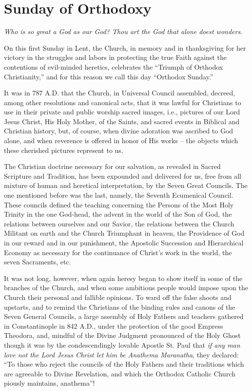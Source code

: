 \chapter{Sunday of Orthodoxy}

\textit{Who is so great a God as our God? Thou art the God that alone doest wonders}.

On this first Sunday in Lent, the Church, 
in memory and in thanksgiving for her victory
in the struggles and labors in protecting 
the true Faith against the contentions of evil-minded
heretics, celebrates the ``Triumph of 
Orthodox Christianity,'' and for this reason we 
call this day ``Orthodox Sunday.'' 

It was in 787 A.D. that the Church, in Universal
Council assembled, decreed, among other 
resolutions and canonical acts, that it was lawful 
for Christians to use in their private and public 
worship sacred images, i.e., pictures of our 
Lord Jesus Christ, His Holy Mother, of the 
Saints, and sacred events in Biblical and Christian
history, but, of course, when divine adoration
was ascribed to God alone, and when reverence
is offered in honor of His works -- the 
objects which these cherished pictures represent 
to us. 

The Christian doctrine necessary for our salvation,
as revealed in Sacred Scripture and 
Tradition, has been expounded and delivered 
for us, free from all mixture of human and heretical 
interpretation, by the Seven Great Councils. 
The one mentioned before was the last, namely, 
the Seventh Ecumenical Council. These councils
defined the teaching concerning the Persons 
of the Most Holy Trinity in the one God-head, 
the advent in the world of the Son of God, the 
relations between ourselves and our Savior, 
the relations between the Church Militant on 
earth and the Church Triumphant in heaven, 
the Providence of God in our reward and in 
our punishment, the Apostolic Succession and 
Hierarchical Economy as necessary for the continuance
of Christ's work in the world, the seven 
Sacraments, etc. 

It was not long, however, when again heresy 
began to show itself in some of the branches of 
the Church, and when some ambitious people 
would impose upon the Church their personal 
and fallible opinions. To ward off the false 
shoots and upstarts, and to remind the Christians
of the binding rules and canons of the 
Seven General Councils, a large assembly of 
Holy Fathers and teachers gathered in Constantinople
in 842 A.D., under the protection 
of the good Empress Theodora, and, mindful of 
the Divine Judgment pronounced of the Holy 
Ghost though it was by the condescendingly 
lovable Apostle St. Paul that \textit{if any man love 
not the Lord Jesus Christ let him be Anathema 
Maranatha}, they declared: ``To those who reject
the councils of the Holy Fathers and their 
traditions which are agreeable to Divine Revelation,
and which the Orthodox Catholic Church 
piously maintains, anathema''! 

